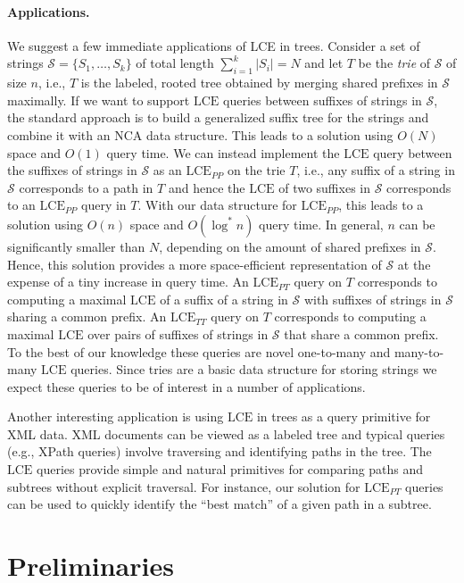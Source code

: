\documentclass [10pt]{article}
\newcommand{\LCE}{\ensuremath{\mathrm{LCE}}}
\newcommand{\LCEPP}{\ensuremath{\mathrm{LCE}_{\mathit{PP}}}}
\newcommand{\LCEPT}{\ensuremath{\mathrm{LCE}_{\mathit{PT}}}}
\newcommand{\LCETT}{\ensuremath{\mathrm{LCE}_{\mathit{TT}}}}
\begin{document}
\paragraph{\bf Applications.}
We suggest a few immediate applications of LCE in trees. Consider a set of strings $\mathcal{S} = \{S_1, \ldots, S_k\}$ of total length $\sum_{i = 1}^k |S_i| = N$ and let $T$ be the \emph{trie} of $\mathcal{S}$ of size $n$, i.e., $T$ is the labeled, rooted tree obtained by merging shared prefixes in $\mathcal{S}$ maximally. If we want to support $\LCE$ queries between suffixes of strings in $\mathcal{S}$, the standard approach is to build a generalized suffix tree for the strings and combine it with an NCA data structure. This leads to a solution using $O(N)$ space and $O(1)$ query time. We can instead implement the $\LCE$ query between the suffixes of strings in $\mathcal{S}$ as an $\LCEPP$ on the trie $T$, i.e., any suffix of a string in $\mathcal{S}$ corresponds to a path in $T$ and hence the $\LCE$ of two suffixes in $\mathcal{S}$ corresponds to an $\LCEPP$ query in $T$. With our data structure for  $\LCEPP$, this leads to  a solution using $O(n)$ space and $O(\log^{*} n)$ query time. In general, $n$ can be significantly smaller than $N$, depending on the amount of shared prefixes in $\mathcal{S}$.  Hence, this solution provides a more space-efficient representation of $\mathcal{S}$ at the expense of a tiny increase in query time. An $\LCEPT$ query on $T$ corresponds to computing a maximal $\LCE$ of a suffix of a string in $\mathcal{S}$ with suffixes of strings in $\mathcal{S}$ sharing a common prefix. An $\LCETT$ query on $T$ corresponds to computing a maximal $\LCE$ over pairs of suffixes of strings in $\mathcal{S}$ that share a common prefix. To the best of our knowledge these queries are novel one-to-many and many-to-many $\LCE$ queries. Since tries are a basic data structure for storing strings we expect these queries to be of interest in a number of applications.

Another interesting application is using $\LCE$ in trees as a query primitive for XML data. XML documents can be viewed as a labeled tree and typical queries (e.g., XPath queries) involve traversing and identifying paths in the tree. The $\LCE$ queries provide simple and natural primitives for comparing paths and subtrees without explicit traversal. For instance, our  solution for $\LCEPT$ queries can be used to quickly identify the ``best match'' of a given path in a subtree.


\section{Preliminaries} 
\end{document}
